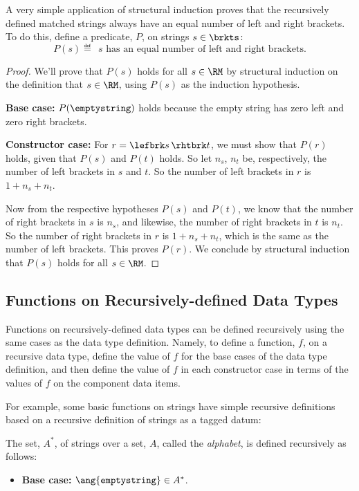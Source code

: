 \begin{definition}
A very simple application of structural induction proves that the
recursively defined matched strings always have an equal number of left
and right brackets.  To do this, define a predicate, $P$, on strings $s
\in \brkts$:
\[
P(s) \eqdef\ \ s \text{ has an equal number of left and right brackets}.
\]
\begin{proof}

  We'll prove that $P(s)$ holds for all $s \in\RM$ by structural induction
  on the definition that $s \in\RM$, using $P(s)$ as the induction
  hypothesis.

\textbf{Base case:} $P(\emptystring)$ holds because the empty string has zero
left and zero right brackets.

\textbf{Constructor case:} For $r = \lefbrk s\,\rhtbrk t$, we must show
that $P(r)$ holds, given that $P(s)$ and $P(t)$ holds.  So let $n_s$,
$n_t$ be, respectively, the number of left brackets in $s$ and $t$.  So
the number of left brackets in $r$ is $1+n_s+n_t$.

Now from the respective hypotheses $P(s)$ and $P(t)$, we know that the
number of right brackets in $s$ is $n_s$, and likewise, the number of
right brackets in $t$ is $n_t$.  So the number of right brackets in
$r$ is $1+n_s+n_t$, which is the same as the number of left brackets.
This proves $P(r)$.  We conclude by structural induction that $P(s)$ holds
for all $s \in\RM$.
\end{proof}

\subsection{Functions on Recursively-defined Data Types}

Functions on recursively-defined data types can be defined recursively
using the same cases as the data type definition.  Namely, to define a
function, $f$, on a recursive data type, define the value of $f$ for the
base cases of the data type definition, and then define the value of $f$
in each constructor case in terms of the values of $f$ on the component
data items.

\iffalse

For example, some basic functions on strings have simple recursive
definitions based on a recursive definition of strings as a tagged datum:

\begin{definition}\label{A*}
The set, $A^*$, of strings over a set, $A$, called the \emph{alphabet},
is defined recursively as follows:
\begin{itemize}
\item \textbf{Base case:} $\ang{\texttt{emptystring}} \in A^*$.


\end{itemize}
\end{definition}
\end{definition}
